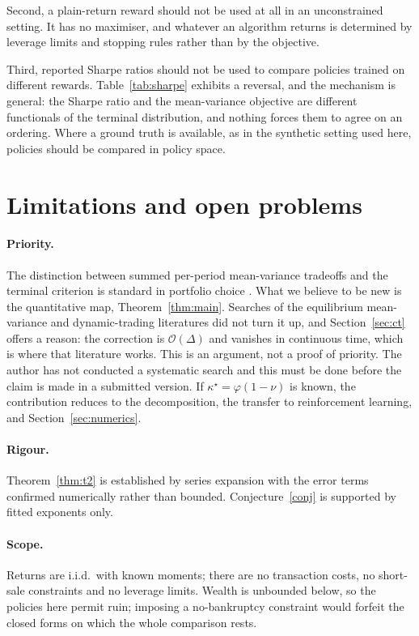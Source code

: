\documentclass[11pt,a4paper]{article}
\theoremstyle{plain}
\theoremstyle{definition}
\theoremstyle{remark}
\begin{document}
Second, a plain-return reward should not be used at all in an unconstrained
setting. It has no maximiser, and whatever an algorithm returns is determined by
leverage limits and stopping rules rather than by the objective.

Third, reported Sharpe ratios should not be used to compare policies trained on
different rewards. Table~\ref{tab:sharpe} exhibits a reversal, and the mechanism
is general: the Sharpe ratio and the mean-variance objective are different
functionals of the terminal distribution, and nothing forces them to agree on an
ordering. Where a ground truth is available, as in the synthetic setting used
here, policies should be compared in policy space.

\section{Limitations and open problems}\label{sec:limits}

\paragraph{Priority.} The distinction between summed per-period mean-variance
tradeoffs and the terminal criterion is standard in portfolio choice
\citep{garleanu,demiguel,ling}. What we believe to be new is the quantitative
map, Theorem~\ref{thm:main}. Searches of the equilibrium mean-variance and
dynamic-trading literatures did not turn it up, and
Section~\ref{sec:ct} offers a reason: the correction is $\mathcal{O}(\Delta)$ and
vanishes in continuous time, which is where that literature works. This is an
argument, not a proof of priority. The author has not conducted a systematic
search and this must be done before the claim is made in a submitted version. If
$\kappa^{\star}=\varphi(1-\nu)$ is known, the contribution reduces to the
decomposition, the transfer to reinforcement learning, and
Section~\ref{sec:numerics}.

\paragraph{Rigour.} Theorem~\ref{thm:t2} is established by series expansion with
the error terms confirmed numerically rather than bounded. Conjecture~\ref{conj}
is supported by fitted exponents only.

\paragraph{Scope.} Returns are i.i.d.\ with known moments; there are no
transaction costs, no short-sale constraints and no leverage limits. Wealth is
unbounded below, so the policies here permit ruin; imposing a no-bankruptcy
constraint would forfeit the closed forms on which the whole comparison rests.
\end{document}
